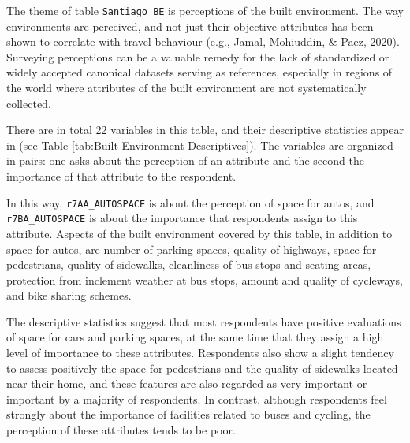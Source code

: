 \documentclass[
11pt, %
oneside, %
english, %
singlespacing, %
]{macthesis} %
\begin{document}
The theme of table \texttt{Santiago\_BE} is perceptions of the built environment. The way environments are perceived, and not just their objective attributes has been shown to correlate with travel behaviour (e.g., Jamal, Mohiuddin, \& Paez, 2020). Surveying perceptions can be a valuable remedy for the lack of standardized or widely accepted canonical datasets serving as references, especially in regions of the world where attributes of the built environment are not systematically collected.

There are in total 22 variables in this table, and their descriptive statistics appear in (see Table \ref{tab:Built-Environment-Descriptives}). The variables are organized in pairs: one asks about the perception of an attribute and the second the importance of that attribute to the respondent.

In this way, \texttt{r7AA\_AUTOSPACE} is about the perception of space for autos, and \texttt{r7BA\_AUTOSPACE} is about the importance that respondents assign to this attribute. Aspects of the built environment covered by this table, in addition to space for autos, are number of parking spaces, quality of highways, space for pedestrians, quality of sidewalks, cleanliness of bus stops and seating areas, protection from inclement weather at bus stops, amount and quality of cycleways, and bike sharing schemes.

The descriptive statistics suggest that most respondents have positive evaluations of space for cars and parking spaces, at the same time that they assign a high level of importance to these attributes. Respondents also show a slight tendency to assess positively the space for pedestrians and the quality of sidewalks located near their home, and these features are also regarded as very important or important by a majority of respondents. In contrast, although respondents feel strongly about the importance of facilities related to buses and cycling, the perception of these attributes tends to be poor.
\end{document}
